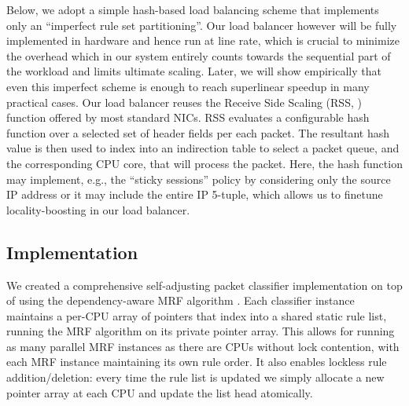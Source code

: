 Below, we adopt a simple hash-based load balancing scheme that implements only an ``imperfect rule set partitioning''. Our load balancer however will be fully implemented in hardware and hence run at line rate, which is crucial to minimize the overhead which in our system entirely counts towards the sequential part of the workload and limits ultimate scaling.  Later, we will show empirically that even this imperfect scheme is enough to reach superlinear speedup in many practical cases. Our load balancer reuses the Receive Side Scaling (RSS, \cite{10.1145/3359989.3365412, rss-linux}) function offered by most standard NICs. RSS evaluates a configurable hash function over a selected set of header fields per each packet. The resultant hash value is then used to index into an indirection table to select a packet queue, and the corresponding CPU core, that will process the packet. Here, the hash function may implement, e.g., the ``sticky sessions'' policy by considering only the source IP address or it may include the entire IP 5-tuple, which allows us to finetune locality-boosting in our load balancer.

\subsection{Implementation}
\label{sec:sa-nf-tables-impl}

We created a comprehensive self-adjusting packet classifier implementation on top of \nftables using the dependency-aware MRF algorithm \cite{10228937}. Each classifier instance maintains a per-CPU array of pointers that index into a shared static rule list, running the MRF algorithm on its private pointer array. This allows for running as many parallel MRF instances as there are CPUs without lock contention, with each MRF instance maintaining its own rule order. It also enables lockless rule addition\slash deletion: every time the rule list is updated we simply allocate a new pointer array at each CPU and update the list head atomically.

